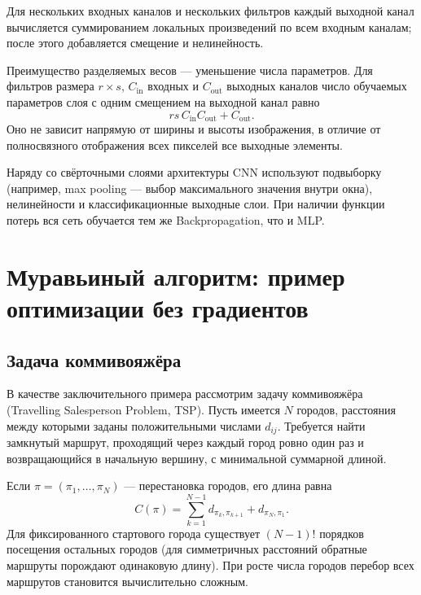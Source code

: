 \documentclass[12pt,a4paper]{article}
\begin{document}
Для нескольких входных каналов и нескольких фильтров
каждый выходной канал вычисляется суммированием
локальных произведений по всем входным каналам;
после этого добавляется смещение и нелинейность.

Преимущество разделяемых весов --- уменьшение числа параметров.
Для фильтров размера $r\times s$, $C_{\mathrm{in}}$ входных
и $C_{\mathrm{out}}$ выходных каналов число обучаемых
параметров слоя с одним смещением на выходной канал равно
\begin{equation}
    rs\,C_{\mathrm{in}}C_{\mathrm{out}}+C_{\mathrm{out}}.
    \label{eq:cnn-params}
\end{equation}
Оно не зависит напрямую от ширины и высоты изображения,
в отличие от полносвязного отображения всех пикселей
все выходные элементы.

Наряду со свёрточными слоями архитектуры CNN используют
подвыборку (например, max pooling --- выбор максимального
значения внутри окна), нелинейности и классификационные
выходные слои. При наличии функции потерь вся сеть
обучается тем же Backpropagation, что и MLP.

\section{Муравьиный алгоритм: пример оптимизации без градиентов}

\subsection{Задача коммивояжёра}

В качестве заключительного примера рассмотрим задачу
коммивояжёра (Travelling Salesperson Problem, TSP).
Пусть имеется $N$ городов, расстояния между которыми
заданы положительными числами $d_{ij}$.
Требуется найти замкнутый маршрут, проходящий через каждый
город ровно один раз и возвращающийся в начальную вершину,
с минимальной суммарной длиной.

Если $\pi=(\pi_1,\ldots,\pi_N)$ --- перестановка городов,
его длина равна
\begin{equation}
    C(\pi)=\sum_{k=1}^{N-1}d_{\pi_k,\pi_{k+1}}
      +d_{\pi_N,\pi_1}.
    \label{eq:tsp}
\end{equation}
Для фиксированного стартового города существует
$(N-1)!$ порядков посещения остальных городов
(для симметричных расстояний обратные маршруты
порождают одинаковую длину).
При росте числа городов перебор всех маршрутов
становится вычислительно сложным.
\end{document}
